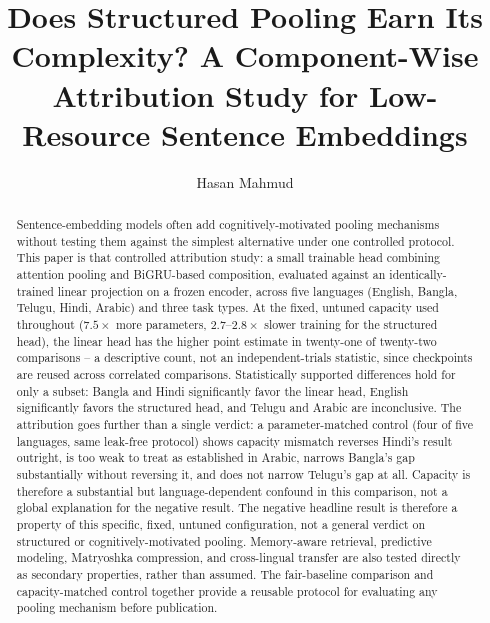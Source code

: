 \documentclass[manuscript]{acmart}
\begin{document}

\title[Does Structured Pooling Earn Its Complexity?]{Does Structured Pooling Earn Its Complexity? A Component-Wise Attribution Study for Low-Resource Sentence Embeddings}

\author{Hasan Mahmud}

\renewcommand{\shortauthors}{Mahmud}

\begin{abstract}
Sentence-embedding models often add cognitively-motivated pooling mechanisms without testing them against the simplest alternative under one controlled protocol. This paper is that controlled attribution study: a small trainable head combining attention pooling and BiGRU-based composition, evaluated against an identically-trained linear projection on a frozen encoder, across five languages (English, Bangla, Telugu, Hindi, Arabic) and three task types. At the fixed, untuned capacity used throughout ($7.5\times$ more parameters, $2.7$--$2.8\times$ slower training for the structured head), the linear head has the higher point estimate in twenty-one of twenty-two comparisons -- a descriptive count, not an independent-trials statistic, since checkpoints are reused across correlated comparisons. Statistically supported differences hold for only a subset: Bangla and Hindi significantly favor the linear head, English significantly favors the structured head, and Telugu and Arabic are inconclusive. The attribution goes further than a single verdict: a parameter-matched control (four of five languages, same leak-free protocol) shows capacity mismatch reverses Hindi's result outright, is too weak to treat as established in Arabic, narrows Bangla's gap substantially without reversing it, and does not narrow Telugu's gap at all. Capacity is therefore a substantial but language-dependent confound in this comparison, not a global explanation for the negative result. The negative headline result is therefore a property of this specific, fixed, untuned configuration, not a general verdict on structured or cognitively-motivated pooling. Memory-aware retrieval, predictive modeling, Matryoshka compression, and cross-lingual transfer are also tested directly as secondary properties, rather than assumed. The fair-baseline comparison and capacity-matched control together provide a reusable protocol for evaluating any pooling mechanism before publication.
\end{abstract}
\end{document}
